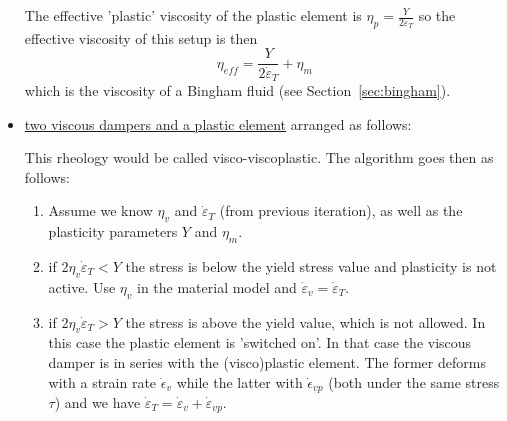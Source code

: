 \begin{itemize}
The effective 'plastic' viscosity of the plastic element is $\eta_p =  \frac{Y}{2 \dot{\varepsilon}_T}$ so 
the effective viscosity of this setup is then  
\[
\eta_{eff} = \frac{Y}{2 \dot{\varepsilon}_T}+\eta_m
\]
which is the viscosity of a Bingham fluid (see Section~\ref{sec:bingham}).


\item \underline{two viscous dampers and a plastic element} arranged as follows:
\begin{center}

\end{center}
This rheology would be called visco-viscoplastic.
The algorithm goes then as follows:
\begin{enumerate}
\item Assume we know $\eta_v$ and $\dot\varepsilon_T$ (from previous iteration), as well as the plasticity parameters $Y$ and $\eta_m$.
\item if $2 \eta_v \dot\varepsilon_T < Y$ the stress is below the yield stress value and plasticity is not active. Use $\eta_v$ in the material model and $\dot\varepsilon_v=\dot\varepsilon_T$.

\item if $2 \eta_v \dot\varepsilon_T > Y$ the stress is above the yield value, which is not allowed. In this case the plastic element is 'switched on'. In that case the viscous damper is in series with the (visco)plastic element. The former deforms with a strain rate $\dot\epsilon_v$ while the latter with $\dot\epsilon_{vp}$ (both under the same stress $\tau$) and we have  $\dot\varepsilon_T = \dot\varepsilon_v  + \dot\varepsilon_{vp}$. 


\end{enumerate}
\end{itemize}
